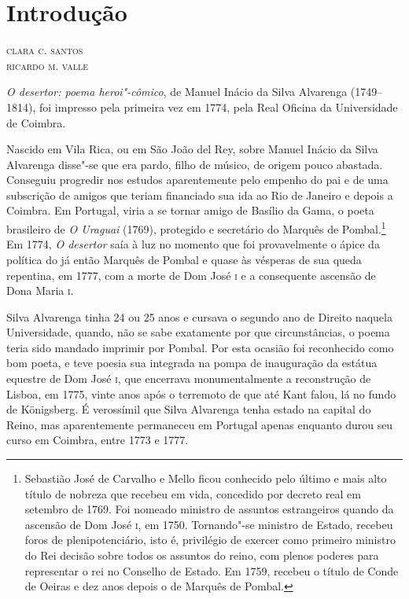 \chapter[Introdução, \emph{por Clara S. Santos e Ricardo M. Valle}]{Introdução}

\begin{flushright}
\textsc{clara c. santos\\ricardo m. valle}
\end{flushright}

\noindent{}\textit{O desertor: poema heroi"-cômico}, de Manuel Inácio
da Silva Alvarenga (1749--1814), foi impresso pela primeira
vez em 1774, pela Real Oficina da Universidade de Coimbra.

Nascido em Vila Rica, ou em São João del Rey, sobre Manuel Inácio da Silva
Alvarenga disse"-se que era pardo, filho de músico, de origem pouco abastada.
Conseguiu progredir nos estudos aparentemente pelo empenho do pai e de uma
subscrição de amigos que teriam financiado sua ida ao Rio de Janeiro e depois a
Coimbra. Em Portugal, viria a se tornar amigo de Basílio da Gama, o poeta
brasileiro de \textit{O Uraguai} (1769), protegido e secretário do Marquês de
Pombal.\footnote{  Sebastião José de Carvalho e Mello ficou conhecido pelo último
e mais alto título de nobreza que recebeu em vida, concedido por decreto real em
setembro de 1769. Foi nomeado ministro de assuntos estrangeiros quando da
ascensão de Dom José \textsc{i}, em 1750. Tornando"-se ministro de Estado,
recebeu foros de plenipotenciário, isto é, privilégio de exercer como primeiro
ministro do Rei decisão sobre todos os assuntos do reino, com plenos poderes
para representar o rei no Conselho de Estado. Em 1759, recebeu o título de Conde
de Oeiras e dez anos depois o de Marquês de Pombal. }  Em 1774, \textit{O
desertor} saía à luz no momento que foi provavelmente o ápice da política do já
então Marquês de Pombal e quase às vésperas de sua queda repentina, em 1777, com
a morte de Dom José \textsc{i} e a consequente ascensão de Dona Maria
\textsc{i}.

Silva Alvarenga tinha 24 ou 25 anos e cursava o segundo ano de Direito naquela
Universidade, quando, não se sabe exatamente por que circunstâncias, o poema
teria sido mandado imprimir por Pombal. Por esta ocasião foi reconhecido como
bom poeta, e teve poesia sua integrada na pompa de inauguração da estátua
equestre de Dom José \textsc{i}, que encerrava monumentalmente a reconstrução de
Lisboa, em 1775, vinte anos após o terremoto de que até Kant falou, lá no fundo
de K\"onigsberg.  É verossímil que Silva Alvarenga tenha estado na capital do
Reino, mas aparentemente permaneceu em Portugal apenas enquanto durou seu curso
em Coimbra, entre 1773 e 1777.

